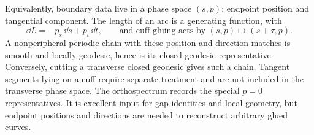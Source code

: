 Equivalently, boundary data live in a phase space $(s,p)$: endpoint
position and tangential component. The length of an arc is a generating
function, with
\[
 \dd L=-p_s\,\dd s+p_t\,\dd t,
 \qquad\text{and cuff gluing acts by }(s,p)\longmapsto(s+\tau,p).
\]
A nonperipheral periodic chain with these position and direction matches
is smooth and locally geodesic, hence is its closed geodesic
representative. Conversely, cutting a transverse closed geodesic gives
such a chain. Tangent segments lying on a cuff require separate treatment
and are not included in the transverse phase space.
The orthospectrum records the special $p=0$ representatives. It is
excellent input for gap identities and local geometry, but endpoint
positions and directions are needed to reconstruct arbitrary glued curves.

